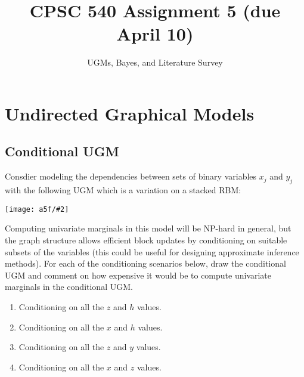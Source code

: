 \documentclass{article}
\begin{document}
\def\blu#1{{\color{blu}#1}}
\def\gre#1{{\color{gre}#1}}
\def\red#1{{\color{red}#1}}
\def\norm#1{\|#1\|}
\newcommand{\argmin}[1]{\mathop{\hbox{argmin}}_{#1}}
\newcommand{\argmax}[1]{\mathop{\hbox{argmax}}_{#1}}
\def\R{\mathbb{R}}
\newcommand{\fig}[2]{\texttt{[image: a5f/\#2]}}
\newcommand{\centerfig}[2]{\begin{center}\texttt{[image: a5f/\#2]}\end{center}}
\def\items#1{\begin{itemize}#1\end{itemize}}
\def\enum#1{\begin{enumerate}#1\end{enumerate}}
\def\argmax{\mathop{\rm arg\,max}}
\def\argmin{\mathop{\rm arg\,min}}
\def\half{\frac 1 2}
\newcommand{\code}[1]{}
\newcommand{\alignStar}[1]{\begin{align*}#1\end{align*}}
\newcommand{\mat}[1]{\begin{bmatrix}#1\end{bmatrix}}



\title{CPSC 540 Assignment 5 (due April 10)}
\author{UGMs, Bayes, and Literature Survey}
\date{}
\maketitle

\section{Undirected Graphical Models}

\subsection{Conditional UGM}

Consdier modeling the dependencies between sets of binary variables $x_j$ and $y_j$ with the following UGM which is a variation on a stacked RBM:
\centerfig{.6}{weirdRBM}
Computing univariate marginals in this model will be NP-hard in general, but the graph structure allows efficient block updates by conditioning on suitable subsets of the variables (this could be useful for designing approximate inference methods).
For each of the conditioning scenarios below, \blu{draw the conditional UGM and comment on how expensive it would be to compute univariate marginals} in the conditional UGM.
\enum{
\item Conditioning on all the $z$ and $h$ values.
\item Conditioning on all the $x$ and $h$ values.
\item Conditioning on all the $z$ and $y$ values.
\item Conditioning on all the $x$ and $z$ values.
}
\end{document}

